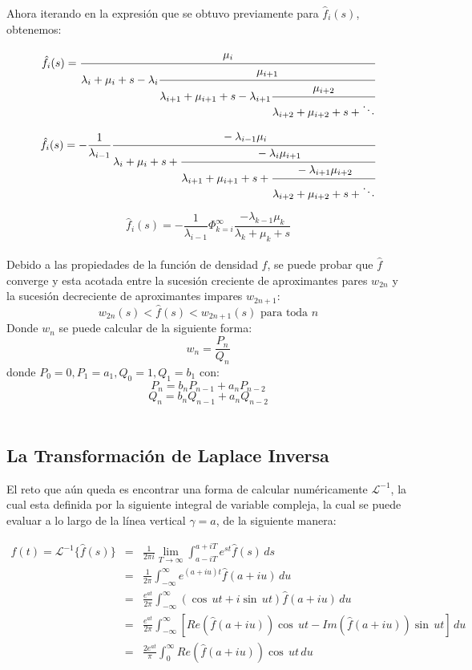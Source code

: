 \documentclass[11pt]{article}
\numberwithin{equation}{section} %
\begin{document}
Ahora iterando en la expresión que se obtuvo previamente para $\hat{f}_i(s)$, obtenemos:

\[
\hat{f}_i (s) = \cfrac{\mu_{i}}{\lambda_{i}+\mu_{i} + s - \lambda_{i}
\cfrac{\mu_{i+1}}{\lambda_{i+1}+\mu_{i+1} + s - \lambda_{i+1}
\cfrac{\mu_{i+2}}{\lambda_{i+2}+\mu_{i+2} + s + \ddots}}}
\]

\[
\hat{f}_i (s) = -\frac{1}{\lambda_{i-1}} \cfrac{-\lambda_{i-1}\mu_{i}}{\lambda_{i}+\mu_{i} + s +
\cfrac{-\lambda_{i}\mu_{i+1}}{\lambda_{i+1}+\mu_{i+1} + s +
\cfrac{-\lambda_{i+1}\mu_{i+2}}{\lambda_{i+2}+\mu_{i+2} + s + \ddots}}}
\]

\begin{equation}
\hat{f}_i (s) = -\frac{1}{\lambda_{i-1}}\Phi_{k=i}^{\infty}\frac{-\lambda_{k-1}\mu_{k}}{\lambda_{k}+\mu_{k}+s}
\end{equation}\\

Debido a las propiedades de la función de densidad $f$, se puede probar \cite{abate1999} que $\hat{f}$ converge y esta acotada entre la sucesión creciente de aproximantes pares $w_{2n}$ y la sucesión decreciente de aproximantes impares $w_{2n+1}$:
\[
w_{2n}(s)<\hat{f}(s)<w_{2n+1}(s) \text{ para toda }n 
\]
Donde $w_n$ se puede calcular de la siguiente forma:
\[
w_n=\frac{P_n}{Q_n}
\]
donde $P_0=0, P_1=a_1,Q_0=1,Q_1=b_1$ con:
\[
P_n=b_n P_{n-1}+a_n P_{n-2}
\]
\[
Q_n=b_n Q_{n-1}+a_n Q_{n-2}
\]
\\

\subsection{La Transformación de Laplace Inversa}

El reto que aún queda es encontrar una forma de calcular numéricamente $\mathcal{L}^{-1}$, la cual esta definida por la siguiente integral de variable compleja, la cual se puede evaluar a lo largo de la línea vertical $\gamma=a$, de la siguiente manera:

\[
\begin{array}{rcl}
f(t) = \mathcal{L}^{-1} \{\hat{f}(s)\} & = & \displaystyle \frac{1}{2 \pi i} \lim_{T\to\infty}\int_{ a - i T}^{ a + i T} e^{st} \hat{f}(s)\,ds\\
& = & \displaystyle \frac{1}{2 \pi} \int_{ -\infty}^{ \infty} e^{(a+iu)t} \hat{f}(a+iu)\,du\\
& = & \displaystyle \frac{e^{at}}{2 \pi} \int_{ -\infty}^{ \infty} (\cos\,ut + i \sin\,ut)\hat{f}(a+iu)\,du\\
& = & \displaystyle \frac{e^{at}}{2 \pi} \int_{ -\infty}^{ \infty} \left[Re(\hat{f}(a+iu))\cos\,ut - Im(\hat{f}(a+iu))\sin\,ut\right]\,du\\
& = & \displaystyle \frac{2e^{at}}{\pi} \int_{0}^{ \infty} Re(\hat{f}(a+iu))\cos\,ut\,du\\
\end{array}
\]
\end{document}
